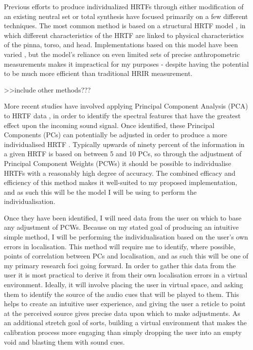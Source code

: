 \documentclass[10pt, oneside, a4paper, draft]{scrartcl}
\begin{document}
Previous efforts to produce individualized HRTFs through either modification of an existing neutral set or total synthesis have focused primarily on a few different techniques. The most common method is based on a structural HRTF model \cite{PhillipBrown1998, Raykar2003}, in which different characteristics of the HRTF are linked to physical characteristics of the pinna, torso, and head. Implementations based on this model have been varied \cite{Tashev2014, Xu2007, DmitryN.ZotkinJaneHwangRamaniDuraiswami2003}, but the model's reliance on even limited sets of precise anthropometric measurements makes it impractical for my purposes - despite having the potential to be much more efficient than traditional HRIR measurement. 

>>include other methods???

More recent studies have involved applying Principal Component Analysis (PCA) to HRTF data \cite{Holzl2012a}, in order to identify the spectral features that have the greatest effect upon the incoming sound signal. Once identified, these Principal Components (PCs) can potentially be adjusted in order to produce a more individualised HRTF \cite{Fink2012,Holzl2014a}. Typically upwards of ninety percent of the information in a given HRTF is based on between 5 and 10 PCs, so through the adjustment of Principal Component Weights (PCWs) it should be possible to individualise HRTFs with a reasonably high degree of accuracy. The combined efficacy and efficiency of this method makes it well-suited to my proposed implementation, and as such this will be the model I will be using to perform the individualisation. 

Once they have been identified, I will need data from the user on which to base any adjustment of PCWs. Because on my stated goal of producing an intuitive simple method, I will be performing the individualisation based on the user's own errors in localisation. This method will require me to identify, where possible, points of correlation between PCs and localisation, and as such this will be one of my primary research foci going forward. In order to gather this data from the user it is most practical to derive it from their own localisation errors in a virtual environment. Ideally, it will involve placing the user in virtual space, and asking them to identify the source of the audio cues that will be played to them. This helps to create an intuitive user experience, and giving the user a reticle to point at the perceived source gives precise data upon which to make adjustments. As an additional stretch goal of sorts, building a virtual environment that makes the calibration process more engaging than simply dropping the user into an empty void and blasting them with sound cues. 
\end{document}
